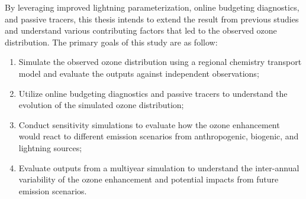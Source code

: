 By leveraging improved lightning parameterization, online budgeting diagnostics, and passive tracers, this thesis intends to extend the result from previous studies and understand various contributing factors that led to the observed ozone distribution. The primary goals of this study are as follow:

\begin{enumerate}
\item{} Simulate the observed ozone distribution using a regional chemistry transport model and evaluate the outputs against independent observations;
\item{} Utilize online budgeting diagnostics and passive tracers to understand the evolution of the simulated ozone distribution;
\item{} Conduct sensitivity simulations to evaluate how the ozone enhancement would react to different emission scenarios from anthropogenic, biogenic, and lightning sources;
\item{} Evaluate outputs from a multiyear simulation to understand the inter-annual variability of the ozone enhancement and potential impacts from future emission scenarios.
\end{enumerate}